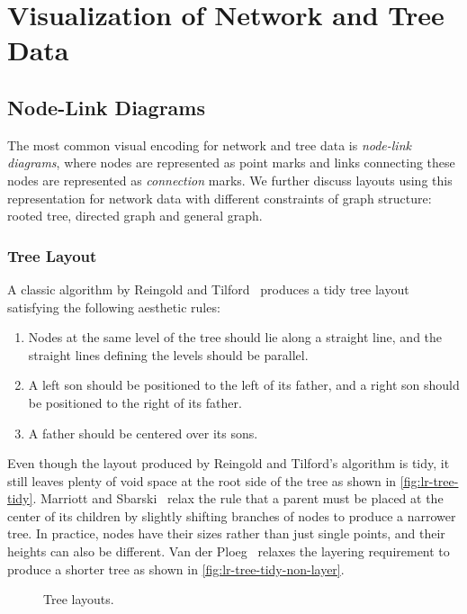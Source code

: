 \section{Visualization of Network and Tree Data}
\label{sub:lr-network}

\subsection{Node-Link Diagrams}
The most common visual encoding for network and tree data is \emph{node-link diagrams}, where nodes are represented as point marks and links connecting these nodes are represented as \emph{connection} marks. We further discuss layouts using this representation for network data with different constraints of graph structure: rooted tree, directed graph and general graph.

\subsubsection{Tree Layout}
A classic algorithm by Reingold and Tilford~\cite{Reingold1981} produces a tidy tree layout satisfying the following aesthetic rules:
\begin{enumerate}
	\item Nodes at the same level of the tree should lie along a straight line, and the straight lines defining the levels should be parallel.
	\item A left son should be positioned to the left of its father, and a right son should be positioned to the right of its father.
	\item A father should be centered over its sons.
\end{enumerate} 

Even though the layout produced by Reingold and Tilford's algorithm is tidy, it still leaves plenty of void space at the root side of the tree as shown in \autoref{fig:lr-tree-tidy}. Marriott and Sbarski~\cite{Marriott2007} relax the rule that a parent must be placed at the center of its children by slightly shifting branches of nodes to produce a narrower tree. In practice, nodes have their sizes rather than just single points, and their heights can also be different. Van der Ploeg~\cite{VanderPloeg2014} relaxes the layering requirement to produce a shorter tree as shown in \autoref{fig:lr-tree-tidy-non-layer}.

\begin{figure}[!htb]
\centering
{}
\hfill
{}
\caption{Tree layouts.}
\end{figure}

